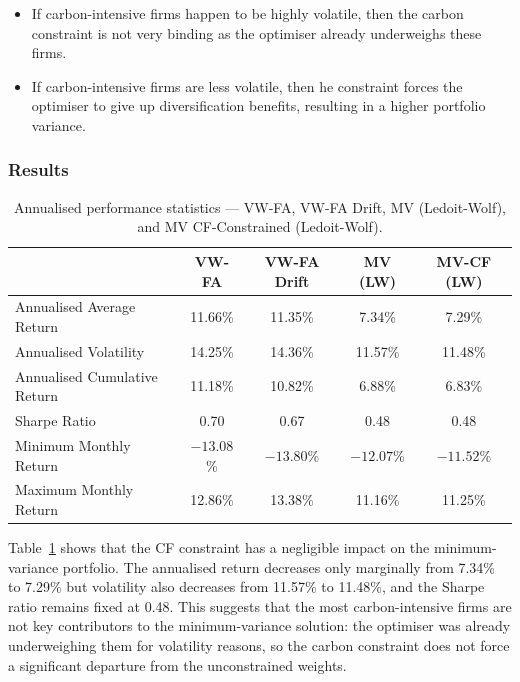 \documentclass[11pt,a4paper]{article}
\begin{document}
\begin{itemize}[leftmargin=*]
    \item If carbon-intensive firms happen to be highly volatile, then the carbon constraint is not very binding as the optimiser already underweighs these firms.
    \item If carbon-intensive firms are less volatile, then he constraint forces the optimiser to give up diversification benefits, resulting in a higher portfolio variance.
\end{itemize}

\subsubsection{Results}

\begin{table}[H]
\centering
\captionsetup{font=footnotesize, justification=centering}
\caption{Annualised performance statistics --- VW-FA, VW-FA Drift, MV (Ledoit-Wolf), and MV CF-Constrained (Ledoit-Wolf).}
\label{tab:stats_cf_drift}
\begin{tabular}{lcccc}
\toprule
 & \textbf{VW-FA} & \textbf{VW-FA Drift} & \textbf{MV (LW)} & \textbf{MV-CF (LW)} \\
\midrule
Annualised Average Return      & 11.66\% & 11.35\% & 7.34\% & 7.29\% \\
Annualised Volatility          & 14.25\% & 14.36\% & 11.57\% & 11.48\% \\
Annualised Cumulative Return   & 11.18\% & 10.82\% & 6.88\% & 6.83\% \\
Sharpe Ratio                   & 0.70    & 0.67    & 0.48   & 0.48 \\
Minimum Monthly Return         & $-13.08$\% & $-13.80$\% & $-12.07$\% & $-11.52$\% \\
Maximum Monthly Return         & 12.86\% & 13.38\% & 11.16\% & 11.25\% \\
\bottomrule
\end{tabular}
\end{table}

Table~\ref{tab:stats_cf_drift} shows that the CF constraint has a negligible impact on the minimum-variance portfolio. The annualised return decreases only marginally from 7.34\% to 7.29\% but volatility also decreases from 11.57\% to 11.48\%, and the Sharpe ratio remains fixed at 0.48. This suggests that the most carbon-intensive firms are not key contributors to the minimum-variance solution: the optimiser was already underweighing them for volatility reasons, so the carbon constraint does not force a significant departure from the unconstrained weights.
\end{document}
